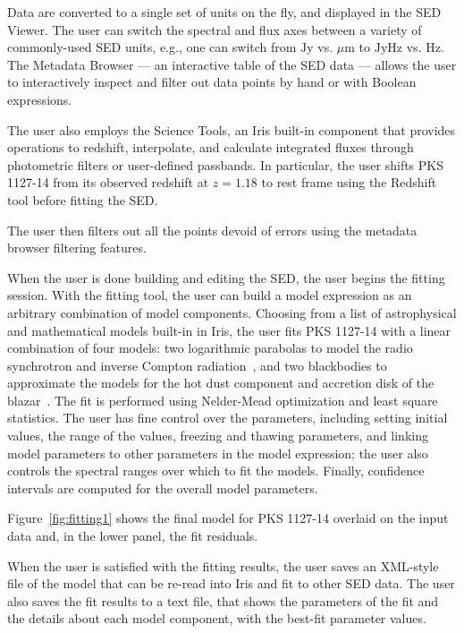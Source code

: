 \documentclass[preprint,authoryear,5p]{elsarticle}
\begin{document}
Data are converted to a single set of units on the fly, and displayed in the SED
Viewer. The user can switch the spectral and flux axes between a variety of
commonly-used SED units, e.g., one can switch from $\mathrm{Jy}$ vs.
${\mu}\mathrm{m}$ to $\mathrm{Jy}\mathrm{Hz}$ vs. $\mathrm{Hz}$. The Metadata
Browser --- an interactive table of the SED data --- allows the user to
interactively inspect and filter out data points by hand or with Boolean
expressions.

The user also employs the Science Tools, an Iris built-in component that
provides operations to redshift, interpolate, and calculate integrated fluxes
through photometric filters or user-defined passbands. In particular, the user
shifts PKS 1127-14 from its observed redshift at $z=1.18$ to rest frame using
the Redshift tool before fitting the SED.

The user then filters out all the points devoid of errors using the metadata browser
filtering features.

When the user is done building and editing the SED, the user begins the fitting
session. With the fitting tool, the user can build a model expression as an
arbitrary combination of model components. Choosing from a list of astrophysical
and mathematical models built-in in Iris, the user fits PKS 1127-14 with a linear
combination of four models: two logarithmic parabolas to model the radio
synchrotron and inverse Compton radiation~\citep{2006A&A...448..861M,2009A&A...501..879T}, 
and two blackbodies to approximate the models for the hot dust component and 
accretion disk of the blazar~\citep{2002ApJ...575..667D}. The fit
is performed using Nelder-Mead optimization and least square statistics. The user
has fine control over the parameters, including setting initial values, the
range of the values, freezing and thawing parameters, and linking model
parameters to other parameters in the model expression; the user also controls the 
spectral ranges over which to fit the models. Finally, confidence intervals are computed 
for the overall model parameters.

Figure~\ref{fig:fitting1} shows the final model for PKS 1127-14 overlaid on the
input data and, in the lower panel, the fit residuals.

When the user is satisfied with the fitting results, the user saves an XML-style file
of the model that can be re-read into Iris and fit to other SED data. The user also
saves the fit results to a text file, that shows the parameters of the fit and
the details about each model component, with the best-fit parameter values.
\end{document}
